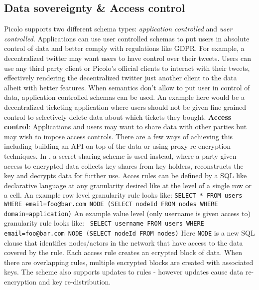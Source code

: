 \subsection{Data sovereignty \& Access control} \label{sec:access_control}
\textsf{Picolo} supports two different schema types: \textit{application controlled} and \textit{user controlled}. Applications can use user controlled schemas to put users in absolute control of data and better comply with regulations like GDPR. For example, a decentralized twitter may  want users to have control over their tweets. Users can use any third party client or \textsf{Picolo}'s official clients to interact with their tweets, effectively rendering the decentralized twitter just another client to the data albeit with better features. \newline\newline
When semantics don't allow to put user in control of data, application controlled schemas can be used. An example here would be a decentralized ticketing application where users should not be given fine grained control to selectively delete data about which tickets they bought.
\newline\newline
\textbf{Access control}:
Applications and users may want to share data with other parties but may wish to impose access controls. There are a few ways of achieving this including building an API on top of the data or using proxy re-encryption techniques. In \cite{ac_p2p_db}, a secret sharing scheme is used instead, where a party given access to encrypted data collects key shares from key holders, reconstructs the key and decrypts data for further use. Acces rules can be defined by a SQL like declarative language at any granularity desired like at the level of a single row or a cell. An example row level granularity rule looks like:\newline \newline
\texttt{SELECT  * \newline FROM users \newline WHERE email=foo@bar.com \newline NODE (SELECT nodeId FROM nodes WHERE domain=application)} \newline \newline
An example value level (only username is given access to) granularity rule looks like:\newline \newline
\texttt{ SELECT username \newline FROM users \newline WHERE email=foo@bar.com \newline NODE (SELECT nodeId FROM nodes)}\newline\newline
Here \texttt{NODE} is a new SQL clause that identifies nodes/actors in the network that have access to the data covered by the rule. Each access rule creates an ecrypted block of data. When there are overlapping rules, multiple encrypted blocks are created with associated keys. The scheme also supports updates to rules - however updates cause data re-encryption and key re-distribution. 

